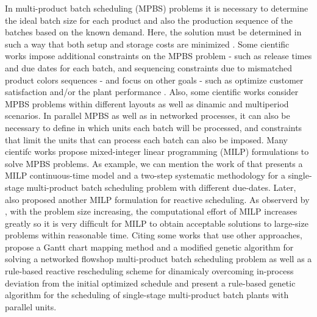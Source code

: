 \documentclass[authoryear,manuscript,12pt]{elsarticle}
\begin{document}
In multi-product batch scheduling (MPBS) problems it is necessary to determine the ideal batch size for each product and also the production sequence of the batches based on the known demand. Here, the solution must be determined in such a way that both setup and storage costs are minimized \citep{Eilon1985, Omega1993, LiuEtAl2020}. Some cientific works impose additional constraints on the MPBS problem - such as release times and due dates for each batch, and sequencing constraints due to mismatched product colors sequences - and focus on other goals - such as optimize customer satisfaction and/or the plant performance \citep{MendezEtAll2000, ShiEtAll2017}. Also, some cientific works consider MPBS problems within different layouts as well as dinamic and multiperiod scenarios. In parallel MPBS as well as in networked processes, it can also be necessary to define in which units each batch will be processed, and constraints that limit the units that can process each batch can also be imposed. Many cientifc works propose mixed-integer linear programming (MILP) formulations to solve MPBS problems. As example, we can mention the work of \cite{MendezEtAll2000} that presents a MILP continuous-time model and a two-step systematic methodology for a single-stage multi-product batch scheduling problem with different due-dates. Later, \cite{MendezCerda2003} also proposed another MILP formulation for reactive scheduling. As observerd by \cite{HeHui2008}, with the problem size increasing, the computational effort of MILP increases greatly so it is very difﬁcult for MILP to obtain acceptable solutions to large-size problems within reasonable time. Citing some works that use other approaches, \cite {KimEtAl1996} propose a Gantt chart mapping method and a modified genetic algorithm for solving a networked flowshop multi-product batch scheduling problem as well as a rule-based reactive rescheduling scheme for dinamicaly overcoming in-process deviation from the initial optimized schedule and \cite{HeHui2008} present a rule-based genetic algorithm for the scheduling of single-stage multi-product batch plants with parallel units.
\end{document}
